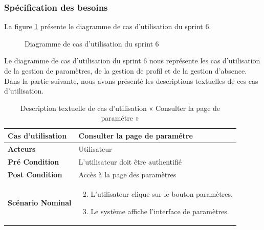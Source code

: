 \subsubsection{Spécification des besoins}
La figure \ref{fig:UseCaseDiagramSp61} présente le diagramme de cas d'utilisation du sprint 6.


\begin{figure}[H]
  \centering
  \caption{Diagramme de cas d'utilisation du sprint 6}
  \label{fig:UseCaseDiagramSp61}
\end{figure}

Le diagramme de cas d'utilisation du sprint 6 nous représente les cas d'utilisation de la gestion de paramètres, de la gestion de profil et de la gestion d'absence.\\

Dans la partie suivante, nous avons présenté les descriptions textuelles de ces cas d'utilisation.


\begin{longtable}{|p{5cm}|p{10cm}|}
  \caption{Description textuelle de cas d'utilisation « Consulter la page de paramétre »} \label{tab:use_case_consult_settings_page} \\
\hline
\textbf{Cas d'utilisation}&Consulter la page de paramétre\\
\hline
\textbf{Acteurs}&Utilisateur\\
\hline
\textbf{Pré Condition}&L'utilisateur doit être authentifié\\
\hline
\textbf{Post Condition}&Accès à la page des paramètres\\
\hline
\textbf{Scénario Nominal}&
\vspace{-\baselineskip}
\begin{enumerate}
  \setcounter{enumi}{1}
    \item L'utilisateur clique sur le bouton paramètres.
    \item Le système affiche l'interface de paramètres.
\end{enumerate}\\
\hline

\end{longtable}



